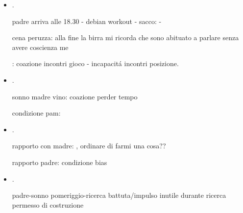 \begin{itemize}
Condizione ilarit\'a post workout che diventa estrema distrazione prima di pranzo e sonno/confusione prima del caf\'e.

studio: non so perc\'e studio

telefonata madre: parlo senza motivo

telefonata padre: impulso scocciatura

dolore: sono solo

condizione coazione situazione fittizia: 

condizione realta\'a me animista: piccoli delirii

\item {}.

padre arriva alle 18.30 - debian workout - sacco:  - 



cena peruzza: alla fine la birra mi ricorda che sono abituato a parlare senza avere coscienza me

: coazione incontri gioco - incapacit\'a incontri posizione.

\item {}.

sonno madre vino: coazione perder tempo

condizione pam:

\item {}.

rapporto con madre: , ordinare di farmi una cosa??

rapporto padre: condizione bias 

\item {}.



 

padre-sonno pomeriggio-ricerca battuta/impulso inutile durante ricerca permesso di costruzione


\end{itemize}

